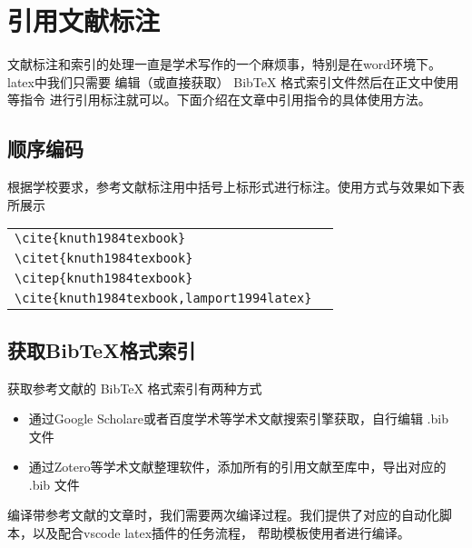 \chapter{引用文献标注}

文献标注和索引的处理一直是学术写作的一个麻烦事，特别是在word环境下。latex中我们只需要
编辑（或直接获取） BibTeX 格式索引文件然后在正文中使用 等指令
进行引用标注就可以。下面介绍在文章中引用指令的具体使用方法。

\section{顺序编码}

根据学校要求，参考文献标注用中括号上标形式进行标注。使用方式与效果如下表所展示

\begin{tabular}{l@{\quad$\Rightarrow$\quad}l}
    \verb|\cite{knuth1984texbook}|               & \cite{knuth1984texbook}               \\
    \verb|\citet{knuth1984texbook}|              & \citet{knuth1984texbook}              \\
    \verb|\citep{knuth1984texbook}|              & \citep{knuth1984texbook}              \\
    \verb|\cite{knuth1984texbook,lamport1994latex}| & \cite{knuth1984texbook,lamport1994latex} \\
\end{tabular}

\section{获取BibTeX格式索引}

获取参考文献的 BibTeX 格式索引有两种方式

\begin{itemize}
    \item 通过Google Scholare或者百度学术等学术文献搜索引擎获取，自行编辑 .bib 文件
    \item 通过Zotero等学术文献整理软件，添加所有的引用文献至库中，导出对应的 .bib 文件
\end{itemize}

编译带参考文献的文章时，我们需要两次编译过程。我们提供了对应的自动化脚本，以及配合vscode latex插件的任务流程，
帮助模板使用者进行编译。

